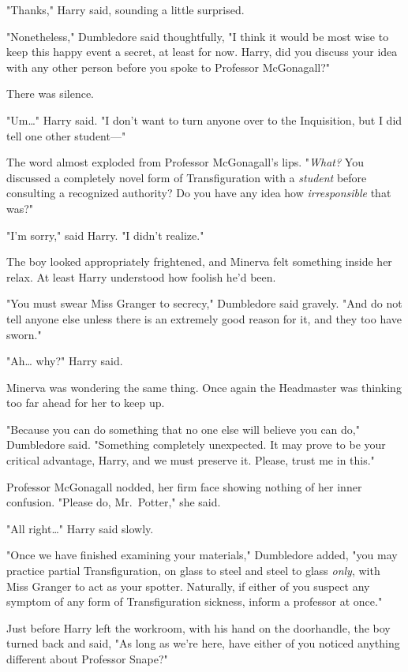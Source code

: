 "Thanks," Harry said, sounding a little surprised.

"Nonetheless," Dumbledore said thoughtfully, "I think it would be most wise to
keep this happy event a secret, at least for now. Harry, did you discuss your
idea with any other person before you spoke to Professor McGonagall?"

There was silence.

"Um{\ldots}" Harry said. "I don't want to turn anyone over to the Inquisition,
but I did tell one other student---"

The word almost exploded from Professor McGonagall's lips. "\emph{What?} You
discussed a completely novel form of Transfiguration with a \emph{student}
before consulting a recognized authority? Do you have any idea how
\emph{irresponsible} that was?"

"I'm sorry," said Harry. "I didn't realize."

The boy looked appropriately frightened, and Minerva felt something inside her
relax. At least Harry understood how foolish he'd been.

"You must swear Miss Granger to secrecy," Dumbledore said gravely. "And do not
tell anyone else unless there is an extremely good reason for it, and they too
have sworn."

"Ah{\ldots} why?" Harry said.

Minerva was wondering the same thing. Once again the Headmaster was thinking
too far ahead for her to keep up.

"Because you can do something that no one else will believe you can do,"
Dumbledore said. "Something completely unexpected. It may prove to be your
critical advantage, Harry, and we must preserve it. Please, trust me in this."

Professor McGonagall nodded, her firm face showing nothing of her inner
confusion. "Please do, Mr.~Potter," she said.

"All right{\ldots}" Harry said slowly.

"Once we have finished examining your materials," Dumbledore added, "you may
practice partial Transfiguration, on glass to steel and steel to glass
\emph{only}, with Miss Granger to act as your spotter. Naturally, if either of
you suspect any symptom of any form of Transfiguration sickness, inform a
professor at once."

Just before Harry left the workroom, with his hand on the doorhandle, the boy
turned back and said, "As long as we're here, have either of you noticed
anything different about Professor Snape?"


